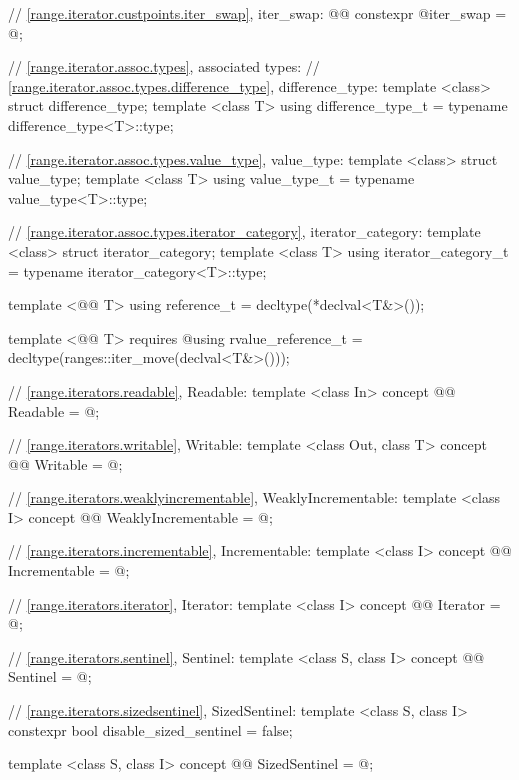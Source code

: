 {\begin{codeblock}
{{{      // \ref{range.iterator.custpoints.iter_swap}, iter_swap:
      @@ constexpr @\unspec@ iter_swap = @\unspec@;
    }

    // \ref{range.iterator.assoc.types}, associated types:
    // \ref{range.iterator.assoc.types.difference_type}, difference_type:
    template <class> struct difference_type;
    template <class T> using difference_type_t
      = typename difference_type<T>::type;

    // \ref{range.iterator.assoc.types.value_type}, value_type:
    template <class> struct value_type;
    template <class T> using value_type_t
      = typename value_type<T>::type;

    // \ref{range.iterator.assoc.types.iterator_category}, iterator_category:
    template <class> struct iterator_category;
    template <class T> using iterator_category_t
      = typename iterator_category<T>::type;

    template <@@ T> using reference_t
      = decltype(*declval<T&>());

    template <@@ T>
        requires @\seebelow@ using rvalue_reference_t
      = decltype(ranges::iter_move(declval<T&>()));

    // \ref{range.iterators.readable}, Readable:
    template <class In>
    concept @@ Readable = @\seebelow@;

    // \ref{range.iterators.writable}, Writable:
    template <class Out, class T>
    concept @@ Writable = @\seebelow@;

    // \ref{range.iterators.weaklyincrementable}, WeaklyIncrementable:
    template <class I>
    concept @@ WeaklyIncrementable = @\seebelow@;

    // \ref{range.iterators.incrementable}, Incrementable:
    template <class I>
    concept @@ Incrementable = @\seebelow@;

    // \ref{range.iterators.iterator}, Iterator:
    template <class I>
    concept @@ Iterator = @\seebelow@;

    // \ref{range.iterators.sentinel}, Sentinel:
    template <class S, class I>
    concept @@ Sentinel = @\seebelow@;

    // \ref{range.iterators.sizedsentinel}, SizedSentinel:
    template <class S, class I>
    constexpr bool disable_sized_sentinel = false;

    template <class S, class I>
    concept @@ SizedSentinel = @\seebelow@;

}}
\end{codeblock}}
